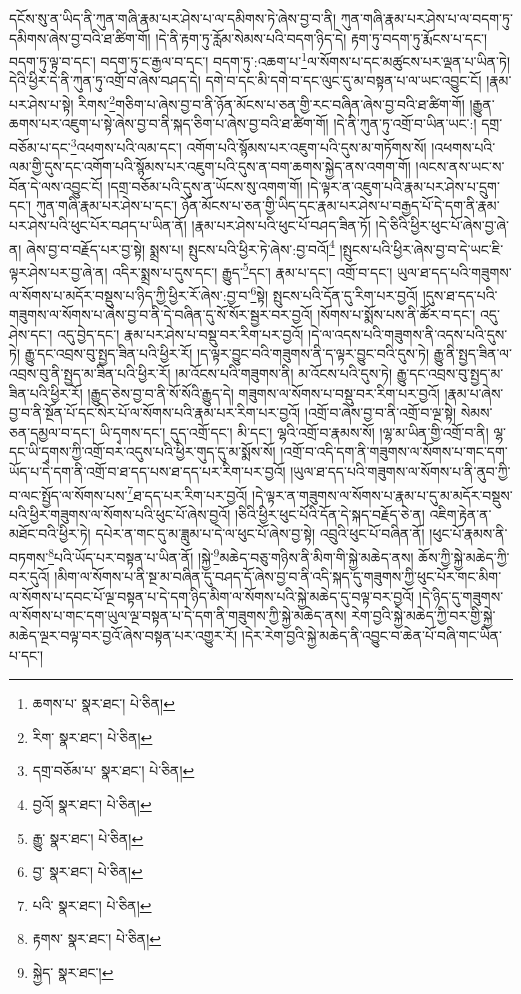 དངོས་སུ་ན་ཡིད་ནི་ཀུན་གཞི་རྣམ་པར་ཤེས་པ་ལ་དམིགས་ཏེ་ཞེས་བྱ་བ་ནི། ཀུན་གཞི་རྣམ་པར་ཤེས་པ་ལ་བདག་ཏུ་དམིགས་ཞེས་བྱ་བའི་ཐ་ཚིག་གོ། །དེ་ནི་རྟག་ཏུ་རློམ་སེམས་པའི་བདག་ཉིད་དེ། རྟག་ཏུ་བདག་ཏུ་རྨོངས་པ་དང་། བདག་ཏུ་ལྟ་བ་དང་། བདག་ཏུ་ང་རྒྱལ་བ་དང་། བདག་ཏུ་:འཆག་པ་\footnote{ཆགས་པ་  སྣར་ཐང་།  པེ་ཅིན། }ལ་སོགས་པ་དང་མཚུངས་པར་ལྡན་པ་ཡིན་ཏེ། དེའི་ཕྱིར་དེ་ནི་ཀུན་ཏུ་འགྲོ་བ་ཞེས་བཤད་དེ། དགེ་བ་དང་མི་དགེ་བ་དང་ལུང་དུ་མ་བསྟན་པ་ལ་ཡང་འབྱུང་ངོ། །རྣམ་པར་ཤེས་པ་སྟེ། རིགས་\footnote{རིག་  སྣར་ཐང་།  པེ་ཅིན། }གཅིག་པ་ཞེས་བྱ་བ་ནི་ཉོན་མོངས་པ་ཅན་གྱི་རང་བཞིན་ཞེས་བྱ་བའི་ཐ་ཚིག་གོ། །རྒྱུན་ཆགས་པར་འཇུག་པ་སྟེ་ཞེས་བྱ་བ་ནི་སྐད་ཅིག་པ་ཞེས་བྱ་བའི་ཐ་ཚིག་གོ། །དེ་ནི་ཀུན་ཏུ་འགྲོ་བ་ཡིན་ཡང་:། དགྲ་བཅོམ་པ་དང་\footnote{དགྲ་བཅོམ་པ་  སྣར་ཐང་།  པེ་ཅིན། }འཕགས་པའི་ལམ་དང་། འགོག་པའི་སྙོམས་པར་འཇུག་པའི་དུས་མ་གཏོགས་སོ། །འཕགས་པའི་ལམ་གྱི་དུས་དང་འགོག་པའི་སྙོམས་པར་འཇུག་པའི་དུས་ན་བག་ཆགས་སྐྱེད་ནས་འགག་གོ། །ལངས་ནས་ཡང་ས་བོན་དེ་ལས་འབྱུང་ངོ། །དགྲ་བཅོམ་པའི་དུས་ན་ཡོངས་སུ་འགག་གོ། །དེ་ལྟར་ན་འཇུག་པའི་རྣམ་པར་ཤེས་པ་དྲུག་དང་། ཀུན་གཞི་རྣམ་པར་ཤེས་པ་དང་། ཉོན་མོངས་པ་ཅན་གྱི་ཡིད་དང་རྣམ་པར་ཤེས་པ་བརྒྱད་པོ་དེ་དག་ནི་རྣམ་པར་ཤེས་པའི་ཕུང་པོར་བཤད་པ་ཡིན་ནོ། །རྣམ་པར་ཤེས་པའི་ཕུང་པོ་བཤད་ཟིན་ཏོ། །དེ་ཅིའི་ཕྱིར་ཕུང་པོ་ཞེས་བྱ་ཞེ་ན། ཞེས་བྱ་བ་བརྗོད་པར་བྱ་སྟེ། སྨྲས་པ། སྤུངས་པའི་ཕྱིར་ཏེ་ཞེས་:བྱ་བའོ།\footnote{བྱའོ།  སྣར་ཐང་།  པེ་ཅིན། } །སྤུངས་པའི་ཕྱིར་ཞེས་བྱ་བ་དེ་ཡང་ཇི་ལྟར་ཤེས་པར་བྱ་ཞེ་ན། འདིར་སྨྲས་པ་དུས་དང་། རྒྱུད་\footnote{རྒྱུ་  སྣར་ཐང་།  པེ་ཅིན། }དང་། རྣམ་པ་དང་། འགྲོ་བ་དང་། ཡུལ་ཐ་དད་པའི་གཟུགས་ལ་སོགས་པ་མདོར་བསྡུས་པ་ཉིད་ཀྱི་ཕྱིར་རོ་ཞེས་:བྱ་བ་\footnote{བྱ་  སྣར་ཐང་།  པེ་ཅིན། }སྟེ། སྤུངས་པའི་དོན་དུ་རིག་པར་བྱའོ། །དུས་ཐ་དད་པའི་གཟུགས་ལ་སོགས་པ་ཞེས་བྱ་བ་ནི་དེ་བཞིན་དུ་སོ་སོར་སྦྱར་བར་བྱའོ། །སོགས་པ་སྨོས་པས་ནི་ཚོར་བ་དང་། འདུ་ཤེས་དང་། འདུ་བྱེད་དང་། རྣམ་པར་ཤེས་པ་བསྡུ་བར་རིག་པར་བྱའོ། །དེ་ལ་འདས་པའི་གཟུགས་ནི་འདས་པའི་དུས་ཏེ། རྒྱུ་དང་འབྲས་བུ་སྤྱད་ཟིན་པའི་ཕྱིར་རོ། །ད་ལྟར་བྱུང་བའི་གཟུགས་ནི་ད་ལྟར་བྱུང་བའི་དུས་ཏེ། རྒྱུ་ནི་སྤྱད་ཟིན་ལ་འབྲས་བུ་ནི་སྤྱད་མ་ཟིན་པའི་ཕྱིར་རོ། །མ་འོངས་པའི་གཟུགས་ནི། མ་འོངས་པའི་དུས་ཏེ། རྒྱུ་དང་འབྲས་བུ་སྤྱད་མ་ཟིན་པའི་ཕྱིར་རོ། །རྒྱུད་ཅེས་བྱ་བ་ནི་སོ་སོའི་རྒྱུད་དེ། གཟུགས་ལ་སོགས་པ་བསྡུ་བར་རིག་པར་བྱའོ། །རྣམ་པ་ཞེས་བྱ་བ་ནི་སྔོན་པོ་དང་སེར་པོ་ལ་སོགས་པའི་རྣམ་པར་རིག་པར་བྱའོ། །འགྲོ་བ་ཞེས་བྱ་བ་ནི་འགྲོ་བ་ལྔ་སྟེ། སེམས་ཅན་དམྱལ་བ་དང་། ཡི་དྭགས་དང་། དུད་འགྲོ་དང་། མི་དང་། ལྷའི་འགྲོ་བ་རྣམས་སོ། །ལྷ་མ་ཡིན་གྱི་འགྲོ་བ་ནི། ལྷ་དང་ཡི་དྭགས་ཀྱི་འགྲོ་བར་འདུས་པའི་ཕྱིར་གུད་དུ་མ་སྨོས་སོ། །འགྲོ་བ་འདི་དག་ནི་གཟུགས་ལ་སོགས་པ་གང་དག་ཡོད་པ་དེ་དག་ནི་འགྲོ་བ་ཐ་དད་པས་ཐ་དད་པར་རིག་པར་བྱའོ། །ཡུལ་ཐ་དད་པའི་གཟུགས་ལ་སོགས་པ་ནི་ནུབ་ཀྱི་བ་ལང་སྤྱོད་ལ་སོགས་པས་\footnote{པའི་  སྣར་ཐང་།  པེ་ཅིན། }ཐ་དད་པར་རིག་པར་བྱའོ། །དེ་ལྟར་ན་གཟུགས་ལ་སོགས་པ་རྣམ་པ་དུ་མ་མདོར་བསྡུས་པའི་ཕྱིར་གཟུགས་ལ་སོགས་པའི་ཕུང་པོ་ཞེས་བྱའོ། །ཅིའི་ཕྱིར་ཕུང་པོའི་དོན་དེ་སྐད་བརྗོད་ཅེ་ན། འཇིག་རྟེན་ན་མཐོང་བའི་ཕྱིར་ཏེ། དཔེར་ན་གང་དུ་མ་ཟླུམ་པ་དེ་ལ་ཕུང་པོ་ཞེས་བྱ་སྟེ། འབྲུའི་ཕུང་པོ་བཞིན་ནོ། །ཕུང་པོ་རྣམས་ནི་བཏགས་\footnote{རྟགས་  སྣར་ཐང་།  པེ་ཅིན། }པའི་ཡོད་པར་བསྟན་པ་ཡིན་ནོ། །སྐྱེ་\footnote{སྐྱེད་  སྣར་ཐང་། }མཆེད་བཅུ་གཉིས་ནི་མིག་གི་སྐྱེ་མཆེད་ནས། ཆོས་ཀྱི་སྐྱེ་མཆེད་ཀྱི་བར་དུའོ། །མིག་ལ་སོགས་པ་ནི་སྔ་མ་བཞིན་དུ་བཤད་དོ་ཞེས་བྱ་བ་ནི་འདི་སྐད་དུ་གཟུགས་ཀྱི་ཕུང་པོར་གང་མིག་ལ་སོགས་པ་དབང་པོ་ལྔ་བསྟན་པ་དེ་དག་ཉིད་མིག་ལ་སོགས་པའི་སྐྱེ་མཆེད་དུ་བལྟ་བར་བྱའོ། །དེ་ཉིད་དུ་གཟུགས་ལ་སོགས་པ་གང་དག་ཡུལ་ལྔ་བསྟན་པ་དེ་དག་ནི་གཟུགས་ཀྱི་སྐྱེ་མཆེད་ནས། རེག་བྱའི་སྐྱེ་མཆེད་ཀྱི་བར་གྱི་སྐྱེ་མཆེད་ལྔར་བལྟ་བར་བྱའོ་ཞེས་བསྟན་པར་འགྱུར་རོ། །དེར་རེག་བྱའི་སྐྱེ་མཆེད་ནི་འབྱུང་བ་ཆེན་པོ་བཞི་གང་ཡིན་པ་དང་། 